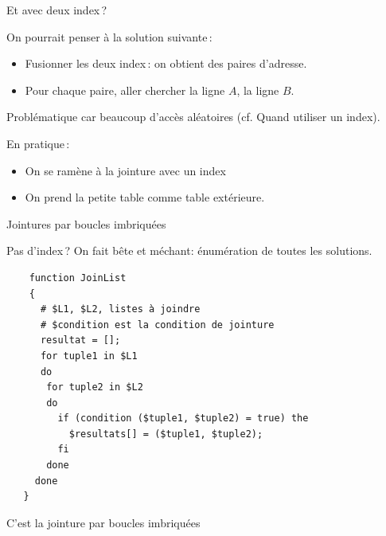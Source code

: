 \begin{frame}{Et avec deux index\,?}

On pourrait penser à la solution suivante\,:

\begin{itemize}
  \item Fusionner les deux index\,: on obtient des paires
                d'adresse.

  \item Pour chaque paire, aller chercher la ligne $A$,
         la ligne $B$.
\end{itemize}

Problématique car beaucoup d'accès aléatoires
(cf. \alert{Quand utiliser un index}). 

\vfill

En pratique\,:

  \begin{itemize}
      \item On se ramène à la jointure avec un index

      \item On prend la petite table comme table extérieure.
\end{itemize}
\end{frame}



\begin{frame}[fragile]{Jointures par boucles imbriquées}

Pas d'index\,? On fait bête et méchant: énumération de toutes
les solutions.

\begin{verbatim}
    function JoinList
    {
      # $L1, $L2, listes à joindre
      # $condition est la condition de jointure
      resultat = [];
      for tuple1 in $L1
      do
       for tuple2 in $L2
       do
         if (condition ($tuple1, $tuple2) = true) the
           $resultats[] = ($tuple1, $tuple2);
         fi
       done
     done
   }
\end{verbatim}

C'est la \alert{jointure par boucles imbriquées}
\end{frame}


